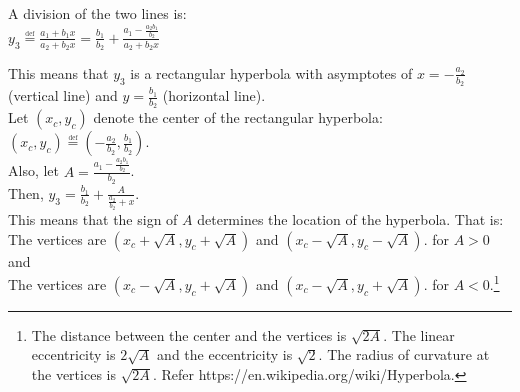 \documentclass[11pt, a4paper]{article}
\newcommand\LongDiv[2]{%
	$\strut#1$\kern.25em\smash{\raise.3ex\hbox{$\big)$}}$\mkern-8mu
	\overline{\enspace\strut#2}$}
\begin{document}
\noindent
A division of the two lines is:\\
$y_3 \overset{\underset{\mathrm{def}}{}}{=} \frac{a_1+b_1x}{a_2+b_2x}=\frac{b_1}{b_2}+\frac{a_1-\frac{a_2 b_1}{b_2}}{a_2+b_2x}$\\

\noindent



\noindent
This means that $y_3$ is a rectangular hyperbola with asymptotes of $x=-\frac{a_2}{b_2}$ (vertical line) and $y=\frac{b_1}{b_2}$ (horizontal line). \\

\noindent
Let $(x_c, y_c)$ denote the center of the rectangular hyperbola: $(x_c, y_c) \overset{\underset{\mathrm{def}}{}}{=} (-\frac{a_2}{b_2}, \frac{b_1}{b_2})$.\\
\noindent
Also, let $A = \frac{a_1-\frac{a_2 b_1}{b_2}}{b_2}$. \\
Then, $y_3= \frac{b_1}{b_2}+\frac{A}{\frac{a_2}{b_2}+x}$.\\

\noindent
This means that the sign of $A$ determines the location of the hyperbola.
That is:\\
The vertices are $(x_c+\sqrt{A}, y_c+\sqrt{A})$ and $(x_c-\sqrt{A}, y_c-\sqrt{A})$. for $A>0$ and\\
The vertices are $(x_c-\sqrt{A}, y_c+\sqrt{A})$ and $(x_c-\sqrt{A}, y_c+\sqrt{A})$. for $A<0$.\footnote{The distance between the center and the vertices is $\sqrt{2A}$. The linear eccentricity is $2\sqrt{A}$ and the eccentricity is $\sqrt{2}$. The radius of curvature at the vertices is $\sqrt{2A}$. Refer https://en.wikipedia.org/wiki/Hyperbola.}\\
\end{document}
